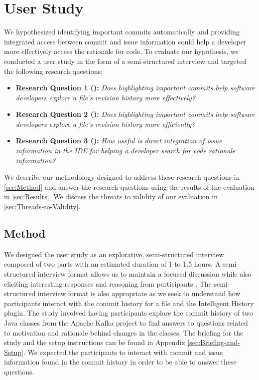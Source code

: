 \chapter{User Study}
\label{ch:Evaluation}

We hypothesized identifying important commits automatically and providing integrated access between commit and issue information could help a developer more effectively access the rationale for code.
To evaluate our hypothesis, we conducted a user study in the form of a semi-structured interview and targeted the following research questions:

\begin{itemize}[leftmargin=*]
    \item[] \label{itm:RQ1} \textbf{Research Question 1 ():} \textit{Does highlighting important commits help software developers explore a file’s revision history more effectively?}
    \item[] \label{itm:RQ2} \textbf{Research Question 2 ():} \textit{Does highlighting important commits help software developers explore a file’s revision history more efficiently?}
    \item[] \label{itm:RQ3} \textbf{Research Question 3 ():} \textit{How useful is direct integration of issue information in the IDE for helping a developer search for code rationale information?}
  \end{itemize}

We describe our methodology designed to address these research questions in \autoref{sec:Method} and answer the research questions using the results of the evaluation in \autoref{sec:Results}.
We discuss the threats to validity of our evaluation in \autoref{sec:Threads-to-Validity}.

\section{Method}
\label{sec:Method}

We designed the user study as an explorative, semi-structured interview composed of two parts with an estimated duration of 1 to 1.5 hours.
A semi-structured interview format allows us to maintain a focused discussion while also eliciting interesting responses and reasoning from participants \cite{shull_guide_2007}.
The semi-structured interview format is also appropriate as we seek to understand how participants interact with the commit history for a file and the Intelligent History plugin.
The study involved having participants explore the commit history of two Java classes from the Apache Kafka project to find answers to questions related to motivation and rationale behind changes in the classes.
The briefing for the study and the setup instructions can be found in Appendix \ref{sec:Briefing-and-Setup}.
We expected the participants to interact with commit and issue information found in the commit history in order to be able to answer these questions.

